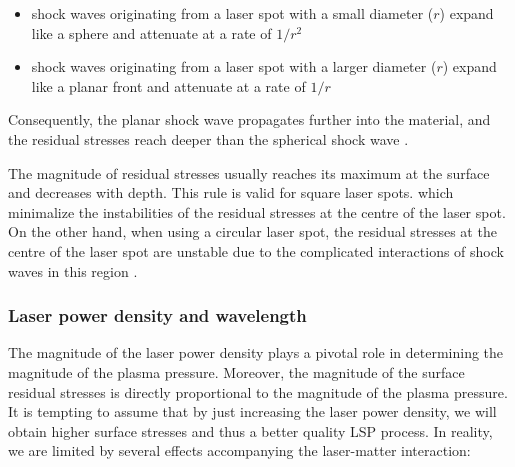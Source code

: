 \begin{itemize}

    \item shock waves originating from a laser spot with a small diameter (\(r\)) expand like a sphere and attenuate at a rate of \(1/r^2\)

    \item shock waves originating from a laser spot with a larger diameter (\(r\))  expand like a planar front and attenuate at a rate of \(1/r\)

\end{itemize}

Consequently, the planar shock wave propagates further into the material, and the residual stresses reach deeper than the spherical shock wave \cite{bolger_montross_rode_1999}. 

The magnitude of residual stresses usually reaches its maximum at the surface and decreases with depth. This rule is valid for square laser spots. which minimalize the instabilities of the residual stresses at the centre of the laser spot. On the other hand, when using a circular laser spot, the residual stresses at the centre of the laser spot are unstable due to the complicated interactions of shock waves in this region \cite{masse_barreau_1995}. 

\subsubsection*{Laser power density and wavelength}

The magnitude of the laser power density plays a pivotal role in determining the magnitude of the plasma pressure. Moreover, the magnitude of the surface residual stresses is directly proportional to the magnitude of the plasma pressure. It is tempting to assume that by just increasing the laser power density, we will obtain higher surface stresses and thus a better quality LSP process. In reality, we are limited by several effects accompanying the laser-matter interaction:

